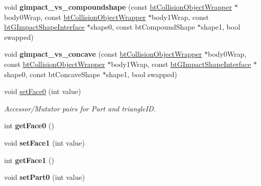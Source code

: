 \begin{DoxyCompactItemize}
void {\bfseries gimpact\+\_\+vs\+\_\+compoundshape} (const \hyperlink{structbtCollisionObjectWrapper}{bt\+Collision\+Object\+Wrapper} $\ast$body0\+Wrap, const \hyperlink{structbtCollisionObjectWrapper}{bt\+Collision\+Object\+Wrapper} $\ast$body1\+Wrap, const \hyperlink{classbtGImpactShapeInterface}{bt\+G\+Impact\+Shape\+Interface} $\ast$shape0, const bt\+Compound\+Shape $\ast$shape1, bool swapped)
\item 
\mbox{\label{classbtGImpactCollisionAlgorithm_a01b9594871d06ed0148c0af4d5f512b9}} 
void {\bfseries gimpact\+\_\+vs\+\_\+concave} (const \hyperlink{structbtCollisionObjectWrapper}{bt\+Collision\+Object\+Wrapper} $\ast$body0\+Wrap, const \hyperlink{structbtCollisionObjectWrapper}{bt\+Collision\+Object\+Wrapper} $\ast$body1\+Wrap, const \hyperlink{classbtGImpactShapeInterface}{bt\+G\+Impact\+Shape\+Interface} $\ast$shape0, const bt\+Concave\+Shape $\ast$shape1, bool swapped)
\item 
\mbox{\label{classbtGImpactCollisionAlgorithm_a10e8bcaf1a0b97b227f37fbda2d50403}} 
void \hyperlink{classbtGImpactCollisionAlgorithm_a10e8bcaf1a0b97b227f37fbda2d50403}{set\+Face0} (int value)
\begin{DoxyCompactList}\small\item\em Accessor/\+Mutator pairs for Part and triangle\+ID. \end{DoxyCompactList}\item 
\mbox{\label{classbtGImpactCollisionAlgorithm_a84e98cf28b7a3df2af4db962e13ba7a6}} 
int {\bfseries get\+Face0} ()
\item 
\mbox{\label{classbtGImpactCollisionAlgorithm_aa6d490d3e7d8648dbdeae5c326afd72a}} 
void {\bfseries set\+Face1} (int value)
\item 
\mbox{\label{classbtGImpactCollisionAlgorithm_a047f913d8ad106b2514890ae4ab1fdb0}} 
int {\bfseries get\+Face1} ()
\item 
\mbox{\label{classbtGImpactCollisionAlgorithm_aa162a549af997e98fed7f28bd04c67e9}} 
void {\bfseries set\+Part0} (int value)
\item 
\mbox{\label{classbtGImpactCollisionAlgorithm_a34208b0e64fb1059eac428fb19380329}} 

\end{DoxyCompactItemize}
